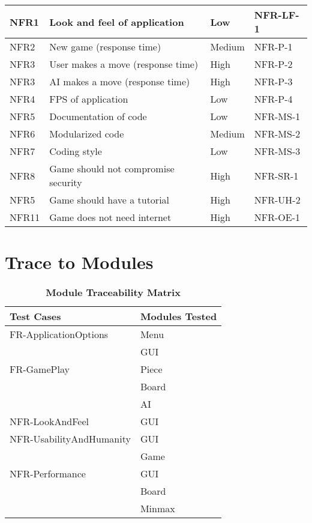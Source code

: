 \documentclass[12pt, titlepage]{article}
\begin{document}
\begin{table}[H]
\begin{center}
\begin{adjustwidth}{-1.5cm}{}
\begin{tabularx}{1.2\textwidth}{|p{3.4cm}|p{7cm}|p{1.6cm}|X|}
		\hline
		\hline
		NFR1 & Look and feel of application & Low & NFR-LF-1\\
		\hline
		NFR2 & New game (response time) & Medium & NFR-P-1 \\
		\hline
		NFR3 & User makes a move (response time) & High & NFR-P-2 \\
		\hline
		NFR3 & AI makes a move (response time) & High & NFR-P-3 \\
		\hline
		NFR4 & FPS of application & Low & NFR-P-4 \\
		\hline
		NFR5 & Documentation of code & Low & NFR-MS-1 \\
		\hline
		NFR6 & Modularized code & Medium & NFR-MS-2 \\
		\hline
		NFR7 & Coding style & Low & NFR-MS-3 \\
		\hline
		NFR8 & Game should not compromise security & High & NFR-SR-1 \\
		\hline
		NFR5 & Game should have a tutorial & High & NFR-UH-2\\
		\hline
		NFR11 & Game does not need internet & High & NFR-OE-1\\
		\hline
	\end{tabularx}
	\end{adjustwidth}
	\end{center}
\end{table}

\section{Trace to Modules}		
\begin{table}[H]
    \begin{center}
	\caption{\bf Module Traceability Matrix}
	\begin{adjustwidth}{-1.5cm}{}
	\begin{tabularx}{1.2\textwidth}{|p{8cm}|X|}
		\hline 
		{\bf Test Cases}  & {\bf Modules Tested} \\
		\hline
		FR-ApplicationOptions & Menu\\
		& GUI\\
		\hline
		FR-GamePlay & Piece\\
		& Board\\
		& AI\\
		\hline
		NFR-LookAndFeel & GUI\\
		\hline
		NFR-UsabilityAndHumanity& GUI\\
		& Game\\
		\hline
		NFR-Performance & GUI\\
		& Board\\
		& Minmax\\
		\hline
	\end{tabularx}
	\end{adjustwidth}
	\end{center}
\end{table}
\end{document}
